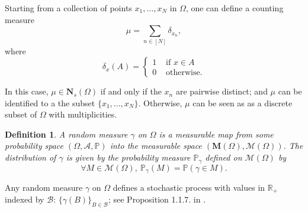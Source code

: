 \documentclass[twoside,11pt]{book}
\newtheorem{definition}{Definition}
\numberwithin{theorem}{chapter}
\numberwithin{definition}{chapter}
\numberwithin{proposition}{chapter}
\numberwithin{corollary}{chapter}
\numberwithin{example}{chapter}
\numberwithin{lemma}{chapter}
\begin{document}
Starting from a collection of points $x_{1}, \dots, x_{N}$ in $\Omega$, one can define a counting measure
\begin{equation}
\mu = \sum\limits_{n \in [N]}\delta_{x_n},
\end{equation}
where
$$
\delta_{x}(A) = \left\{
    \begin{array}{ll}
     1 & \text{ if } x\in A\\
0 & \text{ otherwise}.
\end{array}
\right.
$$

In this case, $\mu \in \mathbf{N}_s(\Omega)$ if and only if the $x_{n}$ are pairwise distinct; and $\mu$ can be identified to a the subset $\{x_{1}, \dots, x_{N}\}$. Otherwise, $\mu$ can be seen as as a discrete subset of $\Omega$ with multiplicities.




\begin{definition}
A random measure $\gamma$ on $\Omega$ is a measurable map from some probability space $(\Omega, \mathcal{A}, \mathbb{P})$  into the measurable space $(\mathbf{M}(\Omega), \mathcal{M}(\Omega))$. The distribution of $\gamma$ is given by the probability measure $\mathbb{P}_{\gamma}$ defined on $\mathcal{M}(\Omega)$ by
\begin{equation}
\forall M \in \mathcal{M}(\Omega), \:\mathbb{P}_{\gamma}(M) = \mathbb{P}(\gamma \in M).
\end{equation}

\end{definition}

Any random measure $\gamma$ on $\Omega$ defines a stochastic process with values in $\mathbb{R}_{+}$ indexed by $\mathcal{B}$: $\{\gamma(B)\}_{B \in \mathcal{B}}$; see Proposition  1.1.7. in \citep*{BaBlKa20}.
\end{document}
